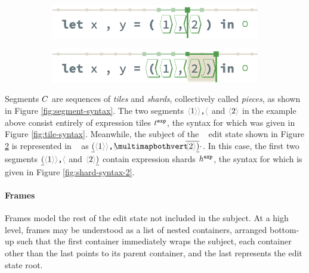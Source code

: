 \begin{figure}
\centering
\begin{subfigure}[c]{0.65\columnwidth}
  \includegraphics[width=\textwidth]{img/zipper-example-1.png}
  \caption{}\label{fig:pointing-zipper-example}
\end{subfigure}
\begin{subfigure}[c]{0.65\columnwidth}
  \includegraphics[width=\textwidth]{img/zipper-example-2.png}
  \caption{}\label{fig:selecting-zipper-example}
\end{subfigure}
\caption{}
\label{fig:zipper-examples}
\end{figure}




Segments $C$ are sequences of \emph{tiles}
and \emph{shards}, collectively called \emph{pieces},
as shown in Figure \ref{fig:segment-syntax}.
The two segments $\optile{\snumlit{1}}\bintile{\tprod}$ and
$\optile{\snumlit{2}}$ in the example above consist
entirely of expression tiles $t^{\texttt{exp}}$,
the syntax for which was given in Figure \ref{fig:tile-syntax}.
Meanwhile, the subject of the \tylr~ edit state shown in
Figure \ref{fig:selecting-zipper-example}
is represented in \ty~ as
$\selecting{\shardlit{(}\optile{\snumlit{1}}\bintile{\tprod}}{\optile{\snumlit{2}}\shardlit{)}}{\cdot}$.
In this case, the first two segments $\shardlit{(}\optile{\snumlit{1}}\bintile{\tprod}$
and $\optile{\snumlit{2}}\shardlit{)}$
contain expression shards $h^{\texttt{exp}}$,
the syntax for which is given in Figure \ref{fig:shard-syntax-2}.



\paragraph{Frames}
Frames model the rest of the edit state not included
in the subject.
At a high level, frames may be understood as a
list of nested containers,
arranged bottom-up such that the first container immediately
wraps the subject, each container other than the last points to its
parent container, and the last represents the edit state root.

